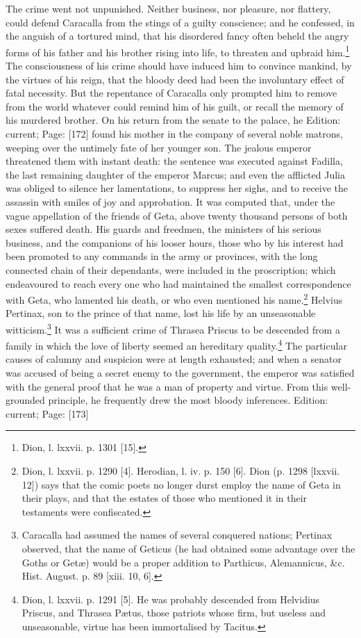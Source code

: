 The crime went not unpunished. Neither business, nor pleasure, nor flattery, could defend Caracalla from the stings of a guilty conscience; and he confessed, in the anguish of a tortured mind, that his disordered fancy often beheld the angry forms of his father and his brother rising into life, to threaten and upbraid him.\footnote{Dion, l. lxxvii. p. 1301 [15].} The consciousness of his crime should have induced him to convince mankind, by the virtues of his reign, that the bloody deed had been the involuntary effect of fatal necessity. But the repentance of Caracalla only prompted him to remove from the world whatever could remind him of his guilt, or recall the memory of his murdered brother. On his return from the senate to the palace, he Edition: current; Page: [172] found his mother in the company of several noble matrons, weeping over the untimely fate of her younger son. The jealous emperor threatened them with instant death: the sentence was executed against Fadilla, the last remaining daughter of the emperor Marcus; and even the afflicted Julia was obliged to silence her lamentations, to suppress her sighs, and to receive the assassin with smiles of joy and approbation. It was computed that, under the vague appellation of the friends of Geta, above twenty thousand persons of both sexes suffered death. His guards and freedmen, the ministers of his serious business, and the companions of his looser hours, those who by his interest had been promoted to any commands in the army or provinces, with the long connected chain of their dependants, were included in the proscription; which endeavoured to reach every one who had maintained the smallest correspondence with Geta, who lamented his death, or who even mentioned his name.\footnote{Dion, l. lxxvii. p. 1290 [4]. Herodian, l. iv. p. 150 [6]. Dion (p. 1298 [lxxvii. 12]) says that the comic poets no longer durst employ the name of Geta in their plays, and that the estates of those who mentioned it in their testaments were confiscated.} Helvius Pertinax, son to the prince of that name, lost his life by an unseasonable witticism.\footnote{Caracalla had assumed the names of several conquered nations; Pertinax observed, that the name of Geticus (he had obtained some advantage over the Goths or Getæ) would be a proper addition to Parthicus, Alemannicus, \&c. Hist. August. p. 89 [xiii. 10, 6].} It was a sufficient crime of Thrasea Priscus to be descended from a family in which the love of liberty seemed an hereditary quality.\footnote{Dion, l. lxxvii. p. 1291 [5]. He was probably descended from Helvidius Priscus, and Thrasea Pætus, those patriots whose firm, but useless and unseasonable, virtue has been immortalised by Tacitus.} The particular causes of calumny and suspicion were at length exhausted; and when a senator was accused of being a secret enemy to the government, the emperor was satisfied with the general proof that he was a man of property and virtue. From this well-grounded principle, he frequently drew the most bloody inferences.
Edition: current; Page: [173]


